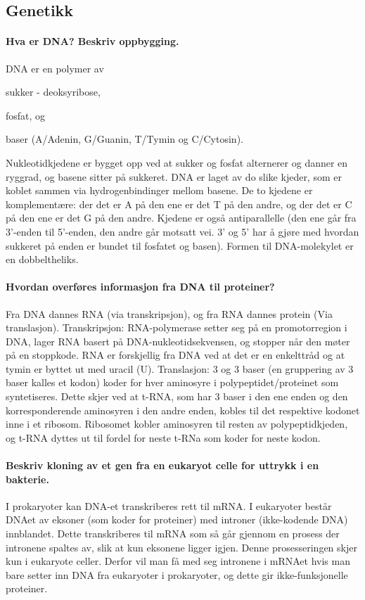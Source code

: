 \subsection{Genetikk}

\paragraph{Hva er DNA? Beskriv oppbygging.} DNA er en polymer av 
\begin{inparaenum}[(i)]
	\item sukker - deoksyribose,
	\item fosfat, og
	\item baser (A/Adenin, G/Guanin, T/Tymin og C/Cytosin).
\end{inparaenum}
Nukleotidkjedene er bygget opp ved at sukker og fosfat alternerer og danner en ryggrad, og basene sitter på sukkeret. DNA er laget av do slike kjeder, som er koblet sammen via hydrogenbindinger mellom basene. De to kjedene er komplementære: der det er A på den ene er det T på den andre, og der det er C på den ene er det G på den andre. Kjedene er også antiparallelle (den ene går fra 3'-enden til 5'-enden, den andre går motsatt vei. 3' og 5' har å gjøre med hvordan sukkeret på enden er bundet til fosfatet og basen). Formen til DNA-molekylet er en dobbeltheliks.

\paragraph{Hvordan overføres informasjon fra DNA til proteiner?} Fra DNA dannes RNA (via transkripsjon), og fra RNA dannes protein (Via translasjon). Transkripsjon: RNA-polymerase setter seg på en promotorregion i DNA, lager RNA basert på DNA-nukleotidsekvensen, og stopper når den møter på en stoppkode. RNA er forskjellig fra DNA ved at det er en enkelttråd og at tymin er byttet ut med uracil (U). Translasjon: 3 og 3 baser (en gruppering av 3 baser kalles et kodon) koder for hver aminosyre i polypeptidet/proteinet som syntetiseres. Dette skjer ved at t-RNA, som har 3 baser i den ene enden og den korresponderende aminosyren i den andre enden, kobles til det respektive kodonet inne i et ribosom. Ribosomet kobler aminosyren til resten av polypeptidkjeden, og t-RNA dyttes ut til fordel for neste t-RNa som koder for neste kodon.

\paragraph{Beskriv kloning av et gen fra en eukaryot celle for uttrykk i en bakterie.} I prokaryoter kan DNA-et transkriberes rett til mRNA. I eukaryoter består DNAet av eksoner (som koder for proteiner) med introner (ikke-kodende DNA) innblandet. Dette transkriberes til mRNA som så går gjennom en prosess der intronene spaltes av, slik at kun eksonene ligger igjen. Denne prosesseringen skjer kun i eukaryote celler. Derfor vil man få med seg intronene i mRNAet hvis man bare setter inn DNA fra eukaryoter i prokaryoter, og dette gir ikke-funksjonelle proteiner.

